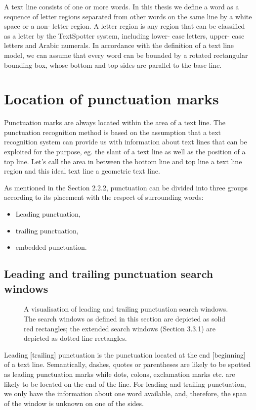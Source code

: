 \documentclass[12pt,a4paper]{report}
\begin{document}
A text line consists of one or more words. In this thesis we define a word as a sequence of letter regions separated from other words on the same line by a white space or a non- letter region. A letter region is any region that can be classified as a letter by the TextSpotter system, including lower- case letters, upper- case letters and Arabic numerals. In accordance with the definition of a text line model, we can assume that every word can be bounded by a rotated rectangular bounding box, whose bottom and top sides are parallel to the base line.

\section{Location of punctuation marks}
Punctuation marks are always located within the area of a text line. The punctuation recognition method is based on the assumption that a text recognition system can provide us with information about text lines that can be exploited for the purpose, eg. the slant of a text line as well as the position of a top line. Let's call the area in between the bottom line and top line a text line region and this ideal text line a geometric text line.

As mentioned in the Section 2.2.2, punctuation can be divided into three groups according to its placement with the respect of surrounding words:
\begin{itemize}
    \item Leading punctuation,
    \item trailing punctuation,
    \item embedded punctuation.
\end{itemize}

\subsection{Leading and trailing punctuation search windows}
\begin{figure}[htbp]
    \centering
    \caption{A visualisation of leading and trailing punctuation search windows. The search windows as defined in this section are depicted as solid red rectangles; the extended search windows (Section 3.3.1) are depicted as dotted line rectangles.}
    \label{fig:leading-trailing}
\end{figure}

Leading [trailing] punctuation is the punctuation located at the end [beginning] of a text line. Semantically, dashes, quotes or parentheses are likely to be spotted as leading punctuation marks while dots, colons, exclamation marks etc. are likely to be located on the end of the line. For leading and trailing punctuation, we only have the information about one word available, and, therefore, the span of the window is unknown on one of the sides.
\end{document}
